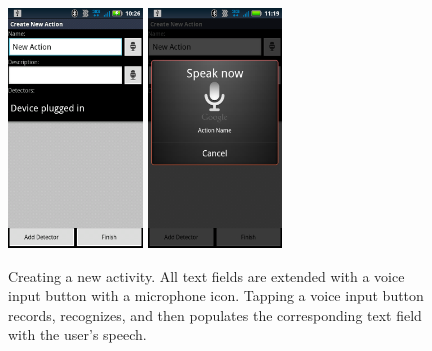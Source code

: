 \documentclass{acm_proc_article-sp}
\begin{document}
\begin{figure}
\begin{center}
\includegraphics[height=2.5in]{voiceinput}
\includegraphics[height=2.5in]{voiceinput2}
\caption{
Creating a new activity. All text fields are extended with a voice input button with a microphone icon. Tapping a voice input button records, recognizes, and then populates the corresponding text field with the user's speech. 
}
\label{figure:voice}
\end{center}
\end{figure}
\end{document}
